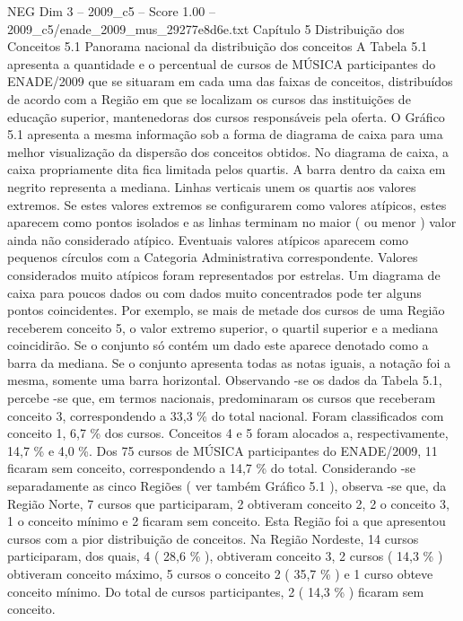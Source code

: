 \begin{textsample}{NEG Dim 3 – 2009\_c5 – Score 1.00 – 2009\_c5/enade\_2009\_mus\_29277e8d6e.txt}  \label{ex:f3_neg_113}
Capítulo 5 Distribuição dos Conceitos 5.1 Panorama nacional da distribuição dos conceitos A Tabela 5.1 apresenta a quantidade e o percentual de cursos de MÚSICA participantes do ENADE/2009 que se situaram em cada uma das faixas de conceitos, distribuídos de acordo com a Região em que se localizam os cursos das instituições de educação superior, mantenedoras dos cursos responsáveis pela oferta.
O Gráfico 5.1 apresenta a mesma informação sob a forma de diagrama de caixa para uma melhor visualização da dispersão dos conceitos obtidos.
No diagrama de caixa, a caixa propriamente dita fica limitada pelos quartis.
A barra dentro da caixa em negrito representa a mediana.
Linhas verticais unem os quartis aos valores extremos.
Se estes valores extremos se configurarem como valores atípicos, estes aparecem como pontos isolados e as linhas terminam no maior ( ou menor ) valor ainda não considerado atípico.
Eventuais valores atípicos aparecem como pequenos círculos com a Categoria Administrativa correspondente.
Valores considerados muito atípicos foram representados por estrelas.
Um diagrama de caixa para poucos dados ou com dados muito concentrados pode ter alguns pontos coincidentes.
Por exemplo, se mais de metade dos cursos de uma Região receberem conceito 5, o valor extremo superior, o quartil superior e a mediana coincidirão.
Se o conjunto só contém um dado este aparece denotado como a barra da mediana.
Se o conjunto apresenta todas as notas iguais, a notação foi a mesma, somente uma barra horizontal.
Observando -se os dados da Tabela 5.1, percebe -se que, em termos nacionais, predominaram os cursos que receberam conceito 3, correspondendo a 33,3 \% do total nacional.
Foram classificados com conceito 1, 6,7 \% dos cursos.
Conceitos 4 e 5 foram alocados a, respectivamente, 14,7 \% e 4,0 \%.
Dos 75 cursos de MÚSICA participantes do ENADE/2009, 11 ficaram sem conceito, correspondendo a 14,7 \% do total.
Considerando -se separadamente as cinco Regiões ( ver também Gráfico 5.1 ), observa -se que, da Região Norte, 7 cursos que participaram, 2 obtiveram conceito 2, 2 o conceito 3, 1 o conceito mínimo e 2 ficaram sem conceito.
Esta Região foi a que apresentou cursos com a pior distribuição de conceitos.
Na Região Nordeste, 14 cursos participaram, dos quais, 4 ( 28,6 \% ), obtiveram conceito 3, 2 cursos ( 14,3 \% ) obtiveram conceito máximo, 5 cursos o conceito 2 ( 35,7 \% ) e 1 curso obteve conceito mínimo.
Do total de cursos participantes, 2 ( 14,3 \% ) ficaram sem conceito.

\end{textsample}
